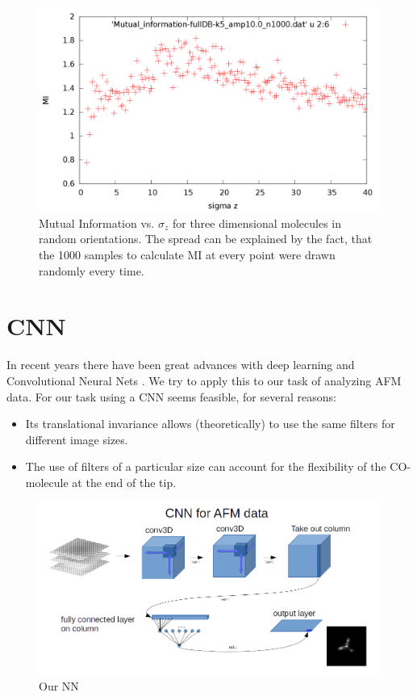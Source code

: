 \documentclass{article}
\begin{document}
 \begin{figure}[htbp]
 	\begin{center}
 		\includegraphics[width=12cm]{figs/Mutual_information-fullDB-k5_amp10_n1000.png}
 		\caption{Mutual Information vs. $\sigma_z$ for three dimensional molecules in random orientations. The spread can be explained by the fact, that the 1000 samples to calculate MI at every point were drawn randomly every time.}
 		\label{fig:MIcurve}
 	\end{center}
 \end{figure}



\newpage
\section{CNN}
In recent years there have been great advances with deep learning and Convolutional Neural Nets \cite{krizhevsky2012imagenet}. We try to apply this to our task of analyzing AFM data. For our task using a CNN seems feasible, for several reasons:
\begin{itemize}
\item Its translational invariance allows (theoretically) to use the same filters for different image sizes.
\item The use of filters of a particular size can account for the flexibility of the CO-molecule at the end of the tip.
\end{itemize}

 \begin{figure}[htbp]
 	\begin{center}
 		\includegraphics[width=12cm]{figs/minimal_CNN.png}
 		\caption{Our NN}
 		\label{fig:NNstruct}
 	\end{center}
 \end{figure}
\end{document}
